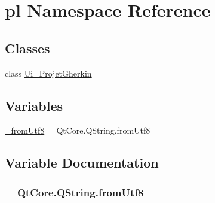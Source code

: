 \hypertarget{namespacepl}{
\section{pl Namespace Reference}
\label{namespacepl}
}
\subsection*{Classes}
\begin{DoxyCompactItemize}
\item 
class \hyperlink{classpl_1_1Ui__ProjetGherkin}{Ui\_\-ProjetGherkin}
\end{DoxyCompactItemize}
\subsection*{Variables}
\begin{DoxyCompactItemize}
\item 
\hyperlink{namespacepl_a86b2c7e3be9b83027885a4cd44be8ef5}{\_\-fromUtf8} = QtCore.QString.fromUtf8
\end{DoxyCompactItemize}


\subsection{Variable Documentation}
\hypertarget{namespacepl_a86b2c7e3be9b83027885a4cd44be8ef5}{
\subsubsection[{\_\-fromUtf8}]{ = QtCore.QString.fromUtf8}}
\label{namespacepl_a86b2c7e3be9b83027885a4cd44be8ef5}
